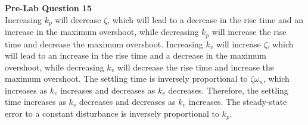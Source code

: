 \documentclass[12pt]{article}
\begin{document}
\textbf{Pre-Lab Question 15} \\
Increasing $k_p$ will decrease $\zeta$, which will lead to a decrease in the rise time and an increase in the maximum overshoot, while decreasing $k_p$ will increase the rise time and decrease the maximum overshoot. Increasing $k_v$ will increase $\zeta$, which will lead to an increase in the rise time and a decrease in the maximum overshoot, while decreasing $k_v$ will decrease the rise time and increase the maximum overshoot. The settling time is inversely proportional to $\zeta\omega_n$, which increases as $k_v$ increases and decreases as $k_v$ decreases. Therefore, the settling time increases as $k_v$ decreases and decreases as $k_v$ increases. The steady-state error to a constant disturbance is inversely proportional to $k_p$. %
\end{document}
